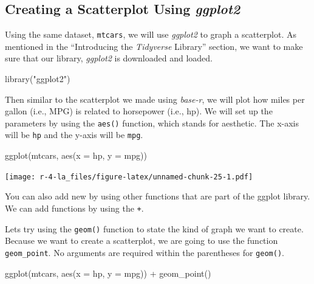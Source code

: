\documentclass[
]{book}
\newenvironment{Shaded}{\begin{snugshade}}{\end{snugshade}}
\newcommand{\AttributeTok}[1]{\textcolor[rgb]{0.77,0.63,0.00}{#1}}
\newcommand{\FunctionTok}[1]{\textcolor[rgb]{0.00,0.00,0.00}{#1}}
\newcommand{\NormalTok}[1]{#1}
\newcommand{\SpecialCharTok}[1]{\textcolor[rgb]{0.00,0.00,0.00}{#1}}
\newcommand{\StringTok}[1]{\textcolor[rgb]{0.31,0.60,0.02}{#1}}
\begin{document}
\hypertarget{creating-a-scatterplot-using-ggplot2}{%
\subsection{\texorpdfstring{Creating a Scatterplot Using \emph{ggplot2}}{Creating a Scatterplot Using ggplot2}}\label{creating-a-scatterplot-using-ggplot2}}

Using the same dataset, \texttt{mtcars}, we will use \emph{ggplot2} to graph a scatterplot. As mentioned in the ``Introducing the \emph{Tidyverse} Library'' section, we want to make sure that our library, \emph{ggplot2} is downloaded and loaded.

\begin{Shaded}
\begin{Highlighting}[]
\FunctionTok{library}\NormalTok{(}\StringTok{"ggplot2"}\NormalTok{)}
\end{Highlighting}
\end{Shaded}

Then similar to the scatterplot we made using \emph{base-r}, we will plot how miles per gallon (i.e., MPG) is related to horsepower (i.e., hp). We will set up the parameters by using the \texttt{aes()} function, which stands for aesthetic. The x-axis will be \texttt{hp} and the y-axis will be \texttt{mpg}.

\begin{Shaded}
\begin{Highlighting}[]
\FunctionTok{ggplot}\NormalTok{(mtcars, }
       \FunctionTok{aes}\NormalTok{(}\AttributeTok{x =}\NormalTok{ hp, }\AttributeTok{y =}\NormalTok{ mpg))}
\end{Highlighting}
\end{Shaded}

\texttt{[image: r-4-la\_files/figure-latex/unnamed-chunk-25-1.pdf]}

You can also add new by using other functions that are part of the ggplot library. We can add functions by using the \texttt{+}.

Lets try using the \texttt{geom()} function to state the kind of graph we want to create. Because we want to create a scatterplot, we are going to use the function \texttt{geom\_point}. No arguments are required within the parentheses for \texttt{geom()}.

\begin{Shaded}
\begin{Highlighting}[]
\FunctionTok{ggplot}\NormalTok{(mtcars, }\FunctionTok{aes}\NormalTok{(}\AttributeTok{x =}\NormalTok{ hp, }\AttributeTok{y =}\NormalTok{ mpg)) }\SpecialCharTok{+} 
      \FunctionTok{geom\_point}\NormalTok{()}
\end{Highlighting}
\end{Shaded}
\end{document}
